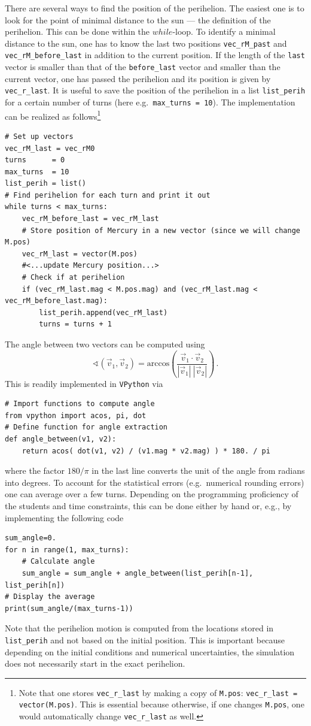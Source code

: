 \documentclass[12pt,ngerman,american]{iopart}
\newcommand{\code}[1]{{\scriptsize\colorbox{light-gray}{\texttt{#1}}}}
\begin{document}
There are several ways to find the position of the perihelion.
The easiest one is to look for the point of minimal distance to the sun --- the definition of the perihelion.
This can be done within the $while$-loop.
To identify a minimal distance to the sun, one has to know the last two positions \code{vec\_rM\_past} and \code{vec\_rM\_before\_last} in addition to the current position.
If the length of the \texttt{last} vector is smaller than that of the \texttt{before\_last} vector and smaller than the current vector, one has passed the perihelion and its position is given by \code{vec\_r\_last}.
It is useful to save the position of the perihelion in a list \code{list\_perih} for a certain number of turns (here e.g.\ \code{max\_turns = 10}).
The implementation can be realized as follows\footnote{%
	Note that one stores \code{vec\_r\_last} by making a copy of \code{M.pos}: \code{vec\_r\_last = vector(M.pos)}.
	This is essential because otherwise, if one changes \code{M.pos}, one would automatically change \code{vec\_r\_last} as well.
}
\begin{lstlisting}
# Set up vectors
vec_rM_last = vec_rM0
turns      = 0
max_turns  = 10
list_perih = list()
# Find perihelion for each turn and print it out
while turns < max_turns:
    vec_rM_before_last = vec_rM_last
    # Store position of Mercury in a new vector (since we will change M.pos)
    vec_rM_last = vector(M.pos)
    #<...update Mercury position...>
    # Check if at perihelion
    if (vec_rM_last.mag < M.pos.mag) and (vec_rM_last.mag < vec_rM_before_last.mag):
        list_perih.append(vec_rM_last)
        turns = turns + 1
\end{lstlisting}
The angle between two vectors can be computed using
 \begin{equation}
 	\sphericalangle(\vec{v}_{1},\vec{v}_2) = \mathrm{arccos} \left( \frac{\vec{v}_{1} \cdot \vec{v}_2}{|\vec{v}_{1}|\:|\vec{v}_2|} \right)
	\, .
 \end{equation}
This is readily implemented in \texttt{VPython} via
\begin{lstlisting}
# Import functions to compute angle
from vpython import acos, pi, dot
# Define function for angle extraction
def angle_between(v1, v2):
    return acos( dot(v1, v2) / (v1.mag * v2.mag) ) * 180. / pi
\end{lstlisting}
where the factor $180/\pi$ in the last line converts the unit of the angle from radians into degrees.
To account for the statistical errors (e.g.\ numerical rounding errors) one can average over a few turns.
Depending on the programming proficiency of the students and time constraints, this can be done either by hand or, e.g., by implementing the following code
\begin{lstlisting}
sum_angle=0.
for n in range(1, max_turns):
    # Calculate angle
    sum_angle = sum_angle + angle_between(list_perih[n-1], list_perih[n])
# Display the average
print(sum_angle/(max_turns-1))
\end{lstlisting}
Note that the perihelion motion is computed from the locations stored in \code{list\_perih} and not based on the initial position.
This is important because depending on the initial conditions and numerical uncertainties, the simulation does not necessarily start in the exact perihelion.
\end{document}
